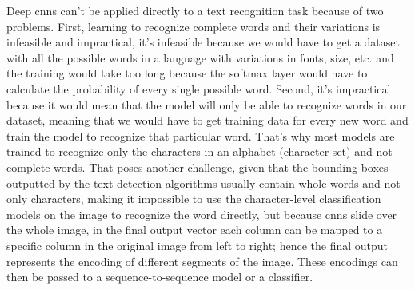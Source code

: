 Deep \gls{cnn}s can't be applied directly to a text recognition task because of two problems. First, learning to recognize complete words and their variations is infeasible and impractical, it's infeasible because we would have to get a dataset with all the possible words in a language with variations in fonts, size, etc. and the training would take too long because the softmax layer would have to calculate the probability of every single possible word. Second, it's impractical because it would mean that the model will only be able to recognize words in our dataset, meaning that we would have to get training data for every new word and train the model to recognize that particular word. That's why most models are trained to recognize only the characters in an alphabet (character set) and not complete words. That poses another challenge, given that the bounding boxes outputted by the text detection algorithms usually contain whole words and not only characters, making it impossible to use the character-level classification models on the image to recognize the word directly, but because \gls{cnn}s slide over the whole image, in the final output vector each column can be mapped to a specific column in the original image from left to right; hence the final output represents the encoding of different segments of the image. These encodings can then be passed to a sequence-to-sequence model or a classifier.

